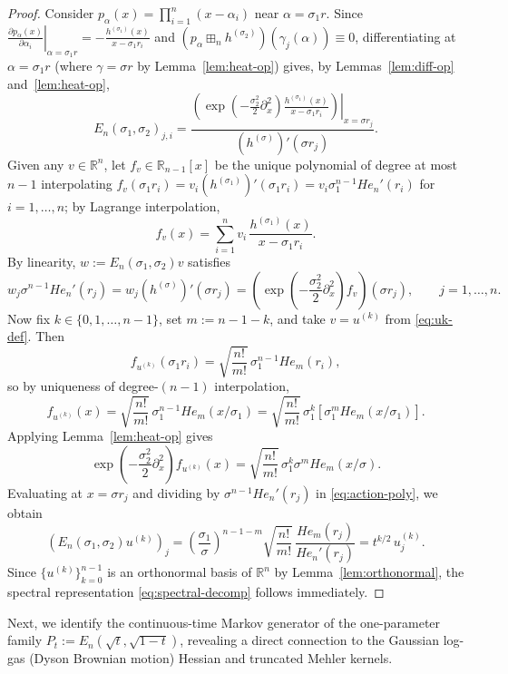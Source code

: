 \documentclass[11pt,a4paper]{article}
\theoremstyle{definition}
\newcommand{\R}{\mathbb{R}}
\newcommand{\boxplusn}{\boxplus_n}
\begin{document}
\begin{proof}
Consider $p_\alpha(x) = \prod_{i=1}^n (x - \alpha_i)$ near $\alpha = \sigma_1 r$. Since $\left.\frac{\partial p_\alpha(x)}{\partial \alpha_i}\right|_{\alpha = \sigma_1 r} = -\frac{h^{(\sigma_1)}(x)}{x - \sigma_1 r_i}$ and $(p_\alpha \boxplusn h^{(\sigma_2)})(\gamma_j(\alpha)) \equiv 0$, differentiating at $\alpha = \sigma_1 r$ (where $\gamma = \sigma r$ by Lemma~\ref{lem:heat-op}) gives, by Lemmas~\ref{lem:diff-op} and~\ref{lem:heat-op},
\[
E_n(\sigma_1, \sigma_2)_{j,i}
= \frac{\left.\left(\exp\!\left(-\frac{\sigma_2^2}{2}\partial_x^2\right) \frac{h^{(\sigma_1)}(x)}{x - \sigma_1 r_i}\right)\right|_{x = \sigma r_j}}{(h^{(\sigma)})'(\sigma r_j)}.
\]
Given any $v \in \R^n$, let $f_v \in \R_{n-1}[x]$ be the unique polynomial of degree at most $n-1$ interpolating $f_v(\sigma_1 r_i) = v_i (h^{(\sigma_1)})'(\sigma_1 r_i) = v_i \sigma_1^{n-1} He_n'(r_i)$ for $i=1,\dots,n$; by Lagrange interpolation,
\[
f_v(x) = \sum_{i=1}^n v_i\, \frac{h^{(\sigma_1)}(x)}{x - \sigma_1 r_i}.
\]
By linearity, $w := E_n(\sigma_1, \sigma_2) v$ satisfies
\begin{equation}
\label{eq:action-poly}
w_j \sigma^{n-1} He_n'(r_j) = w_j (h^{(\sigma)})'(\sigma r_j) = \left(\exp\!\left(-\frac{\sigma_2^2}{2}\partial_x^2\right) f_v\right)(\sigma r_j), \qquad j = 1,\dots,n.
\end{equation}
Now fix $k \in \{0,1,\dots,n-1\}$, set $m := n - 1 - k$, and take $v = u^{(k)}$ from \eqref{eq:uk-def}. Then
\[
f_{u^{(k)}}(\sigma_1 r_i) = \sqrt{\frac{n!}{m!}}\,\sigma_1^{n-1} He_m(r_i),
\]
so by uniqueness of degree-$(n-1)$ interpolation,
\[
f_{u^{(k)}}(x) = \sqrt{\frac{n!}{m!}}\,\sigma_1^{n-1} He_m(x/\sigma_1) = \sqrt{\frac{n!}{m!}}\,\sigma_1^k \left[\sigma_1^m He_m(x/\sigma_1)\right].
\]
Applying Lemma~\ref{lem:heat-op} gives
\[
\exp\!\left(-\frac{\sigma_2^2}{2}\partial_x^2\right) f_{u^{(k)}}(x) = \sqrt{\frac{n!}{m!}}\,\sigma_1^k \sigma^m He_m(x/\sigma).
\]
Evaluating at $x = \sigma r_j$ and dividing by $\sigma^{n-1} He_n'(r_j)$ in \eqref{eq:action-poly}, we obtain
\[
(E_n(\sigma_1,\sigma_2) u^{(k)})_j = \left(\frac{\sigma_1}{\sigma}\right)^{n-1-m} \sqrt{\frac{n!}{m!}}\,\frac{He_m(r_j)}{He_n'(r_j)} = t^{k/2}\, u^{(k)}_j.
\]
Since $\{u^{(k)}\}_{k=0}^{n-1}$ is an orthonormal basis of $\R^n$ by Lemma~\ref{lem:orthonormal}, the spectral representation \eqref{eq:spectral-decomp} follows immediately.
\end{proof}

Next, we identify the continuous-time Markov generator of the one-parameter family $P_t := E_n(\sqrt{t}, \sqrt{1-t})$, revealing a direct connection to the Gaussian log-gas (Dyson Brownian motion) Hessian and truncated Mehler kernels.
\end{document}
